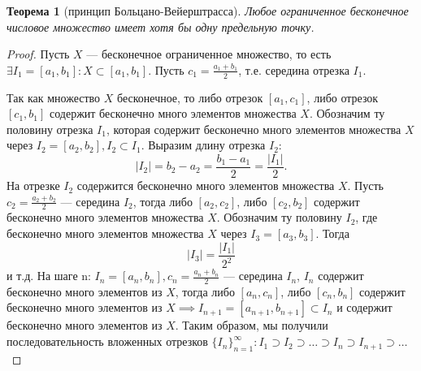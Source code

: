 \documentclass[a4paper,12pt]{article} %
\newtheorem{theorem}{Теорема}[section]
\theoremstyle{remark}
\theoremstyle{definition}
\begin{document}
\begin{theorem}[принцип Больцано-Вейерштрасса]
	Любое ограниченное бесконечное числовое множество имеет хотя бы одну предельную точку.
\end{theorem}
\begin{proof}
	Пусть $X$ --- бесконечное ограниченное множество, то есть $\exists I_1 =[a_1, b_1] : X\subset [a_1, b_1]$.
	Пусть $\displaystyle c_1=\frac{a_1+b_1}{2}$, т.е. середина отрезка $I_1$.
	\begin{center}
	\end{center}
	Так как множество $X$ бесконечное, то либо отрезок $[a_1, c_1]$, либо отрезок $[c_1, b_1]$ содержит бесконечно
    много элементов множества $X$. Обозначим ту половину отрезка $I_1$, которая содержит бесконечно много элементов 
    множества $X$ через $I_2 = [a_2, b_2], I_2\subset I_1$. Выразим длину отрезка $I_2$:
    \[ |I_2| = b_2-a_2 = \frac{b_1-a_1}{2} = \frac{|I_1|}{2} .\] 
    На отрезке $I_2$ содержится бесконечно много элементов множества $X$.
    Пусть $\displaystyle c_2=\frac{a_2+b_2}{2}$ --- середина $I_2$, тогда либо $[a_2, c_2]$, либо $[c_2, b_2]$
    содержит бесконечно много элементов множества $X$. Обозначим ту половину $I_2$,
    где бесконечно много элементов множества $X$ через $I_3 = [a_3, b_3]$. Тогда
    \[ |I_3| = \frac{|I_1|}{2^2} \] 
    и т.д. На шаге n: $\displaystyle I_n=[a_n, b_n], c_n = \frac{a_n + b_n}{2}$ --- середина $I_n$, $I_n$ содержит
    бесконечно много элементов из $X$, тогда либо $[a_n, c_n]$, либо $[c_n, b_n]$ содержит бесконечно много элементов из 
    $X \implies I_{n+1}=[a_{n+1}, b_{n+1}]\subset I_n$ и содержит бесконечно много элементов из $X$. 
    Таким образом, мы получили последовательность вложенных отрезков $\{I_n\}_{n=1}^{\infty} :
    I_1\supset I_2\supset \ldots\supset I_n\supset I_{n+1}\supset \ldots$

\end{proof}
\end{document}

